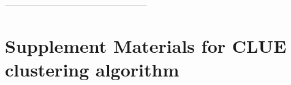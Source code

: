 \documentclass[12pt,reqno]{nuthesis}
\begin{document}
    
    \begin{appendix}
        
        
        --------------------------------------------------
        \chapter{Supplement Materials for CLUE clustering algorithm}
        
        
    \end{appendix}
    
    
    
    
     

    \begin{singlespace}
    
    
    \end{singlespace}
    

    
\end{document}

